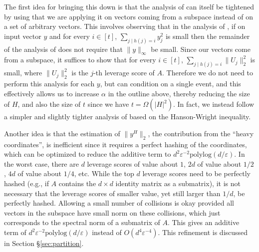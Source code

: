 \documentclass{sig-alternate}
\newcommand{\eps}{\varepsilon}
\newcommand{\polylog}{{\mathrm{polylog}}}
\begin{document}
The first idea
for bringing this down is that the analysis of \cite{dks10} can itself 
be tightened by using that we are applying it on vectors coming 
from a subspace instead of on a set of arbitrary vectors. This involves observing that in the analysis of \cite{dks10}, if on
input vector $y$ and for every $i \in [t]$, $\sum_{j \mid h(j) = i} y_j^2$ is small then the remainder of the analysis of \cite{dks10}
does not require that $\|y\|_{\infty}$ be small. Since our vectors come from a subspace, it suffices to show that for every $i \in [t]$, 
$\sum_{j \mid h(j) = i} \|U_j\|_2^2$ is small, where $\|U_j\|_2^2$ is the $j$-th leverage score of $A$. Therefore we do not
need to perform this analysis for each $y$, but can condition on a single event, and this effectively allows us to 
increase $\alpha$ in the outline above, thereby reducing the size of $H$, and also the size of $t$ since we have
$t = \Omega(|H|^2)$. In fact, we instead follow a simpler and slightly tighter analysis of \cite{KN12} based on the Hanson-Wright
inequality. 

Another idea is that the estimation of $\|y^H\|_2$, the contribution from the 
``heavy coordinates'', is inefficient since it
requires a perfect hashing of the coordinates, which can be optimized to reduce the
additive term to $d^2 \eps^{-2} \polylog(d/\eps)$. In the worst case, there are $d$ leverage scores of value
about $1$, $2d$ of value about $1/2$, $4d$ of value about $1/4$, etc. While the top $d$ leverage
scores need to be perfectly hashed (e.g., if $A$ contains the $d \times d$ identity matrix as a
submatrix), it is not necessary that the leverage scores of smaller value, yet still larger than $1/d$,
be perfectly hashed. Allowing a small number of collisions is okay provided all vectors in the subspace have
small norm on these collisions, which just corresponds to the spectral norm of a submatrix of $A$. This 
gives an additive term of $d^2 \eps^{-2} \polylog(d/\eps)$ instead of $O(d^4 \eps^{-4})$. 
This refinement is discussed in Section \S\ref{sec:partition}.
\end{document}
